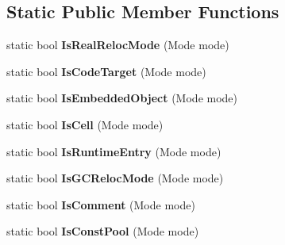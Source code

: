 \subsection*{Static Public Member Functions}
\begin{DoxyCompactItemize}
\item 
static bool {\bfseries Is\+Real\+Reloc\+Mode} (Mode mode)\hypertarget{classv8_1_1internal_1_1_reloc_info_a925d4626231522321411392cf0126ce0}{}\label{classv8_1_1internal_1_1_reloc_info_a925d4626231522321411392cf0126ce0}

\item 
static bool {\bfseries Is\+Code\+Target} (Mode mode)\hypertarget{classv8_1_1internal_1_1_reloc_info_a43f7e86c401d3004a4d51c7c43742310}{}\label{classv8_1_1internal_1_1_reloc_info_a43f7e86c401d3004a4d51c7c43742310}

\item 
static bool {\bfseries Is\+Embedded\+Object} (Mode mode)\hypertarget{classv8_1_1internal_1_1_reloc_info_a22053c0a32e7a602ff948898fe896372}{}\label{classv8_1_1internal_1_1_reloc_info_a22053c0a32e7a602ff948898fe896372}

\item 
static bool {\bfseries Is\+Cell} (Mode mode)\hypertarget{classv8_1_1internal_1_1_reloc_info_aee45e60882b9d9ba02e2beddf23d0f26}{}\label{classv8_1_1internal_1_1_reloc_info_aee45e60882b9d9ba02e2beddf23d0f26}

\item 
static bool {\bfseries Is\+Runtime\+Entry} (Mode mode)\hypertarget{classv8_1_1internal_1_1_reloc_info_a31b175c3f3c5230f0eb4b9ecb5f23791}{}\label{classv8_1_1internal_1_1_reloc_info_a31b175c3f3c5230f0eb4b9ecb5f23791}

\item 
static bool {\bfseries Is\+G\+C\+Reloc\+Mode} (Mode mode)\hypertarget{classv8_1_1internal_1_1_reloc_info_af72572e2c923844b7cce40b08d2a504c}{}\label{classv8_1_1internal_1_1_reloc_info_af72572e2c923844b7cce40b08d2a504c}

\item 
static bool {\bfseries Is\+Comment} (Mode mode)\hypertarget{classv8_1_1internal_1_1_reloc_info_a1d260e2a61c43fb7d6f54ca8870686ec}{}\label{classv8_1_1internal_1_1_reloc_info_a1d260e2a61c43fb7d6f54ca8870686ec}

\item 
static bool {\bfseries Is\+Const\+Pool} (Mode mode)\hypertarget{classv8_1_1internal_1_1_reloc_info_a8fc1dfc884d77d04e030973b71375506}{}\label{classv8_1_1internal_1_1_reloc_info_a8fc1dfc884d77d04e030973b71375506}


\end{DoxyCompactItemize}
